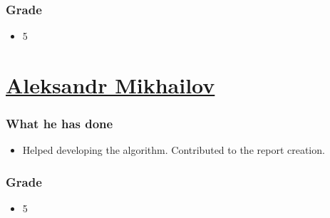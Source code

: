 \documentclass{article}
\begin{document}
\subsubsection*{Grade}
\begin{itemize}
    \item 5
\end{itemize}

\section{\href{mailto:al.mikhailov@innopolis.university}{Aleksandr Mikhailov}}
\subsubsection*{What he has done}
\begin{itemize}
    \item Helped developing the algorithm. Contributed to the report creation.
\end{itemize}

\subsubsection*{Grade}
\begin{itemize}
    \item 5
\end{itemize}
\end{document}
